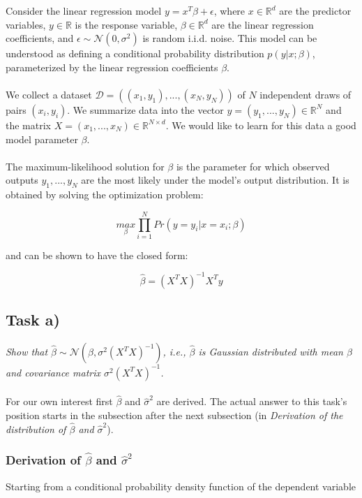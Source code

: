 \documentclass{article}
\begin{document}
Consider the linear regression model $y = x^T \beta + \epsilon$, where $x \in \mathbb{R}^d$ are the predictor variables, $y \in \mathbb{R}$ is the response
variable, $\beta \in \mathbb{R}^d$ are  the  linear  regression  coefficients, and $\epsilon \sim \mathcal{N}(0, \sigma^2)$ is random i.i.d. noise. This  model  can be understood as defining a conditional probability distribution $p(y | x; \beta)$,  parameterized by the linear regression coefficients $\beta$.\\
\\
We collect a dataset $\mathcal{D} = ((x_1, y_1), ..., (x_N, y_N))$ of $N$ independent draws of pairs $(x_i, y_i)$. We summarize data into the vector $y = (y_1,...,y_N) \in \mathbb{R}^N$ and the matrix $X = (x_1, ..., x_N) \in \mathbb{R}^{N\times d}$. We would like to learn for this data a good model parameter $\beta$.\\
\\
The maximum-likelihood solution for $\beta$ is the parameter for which observed outputs $y_1,...,y_N$ are the most likely under the model's output distribution. It is obtained by solving the optimization problem:

\begin{equation}
\underset{\beta}{max} \prod_{i=1}^{N} Pr(y = y_i | x = x_i; \beta)
\end{equation}

and can be shown to have the closed form:

\begin{equation}
\hat\beta = (X^TX)^{-1}X^Ty
\end{equation}

\subsection*{Task a)}

\textit{Show that $\hat\beta \sim \mathcal{N}(\beta, \sigma^2(X^TX)^{-1})$, i.e., $\hat\beta$ is Gaussian distributed with mean $\beta$ and covariance matrix $\sigma^2(X^TX)^{-1}$.}\\
\\
For our own interest first $\hat\beta$ and $\hat\sigma^2$ are derived. The actual answer to this task's position starts in the subsection after the next subsection (in \textit{Derivation of the distribution of $\hat\beta$ and $\hat\sigma^2$}).


\subsubsection*{Derivation of $\hat\beta$ and $\hat\sigma^2$}
Starting from a conditional probability density function of the dependent variable
\end{document}
